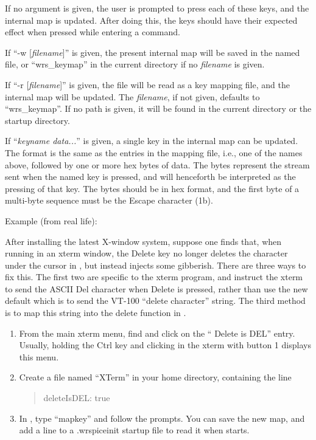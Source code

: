If no argument is given, the user is prompted to press each of these
keys, and the internal map is updated.  After doing this, the keys
should have their expected effect when pressed while entering a
{\WRspice} command.

If ``{\vt -w} [{\it filename\/}]'' is given, the present internal
map will be saved in the named file, or ``{\vt wrs\_keymap}'' in the
current directory if no {\it filename} is given.

If ``{\vt -r} [{\it filename\/}]'' is given, the file will be read
as a key mapping file, and the internal map will be updated.  The
{\it filename}, if not given, defaults to ``{\vt wrs\_keymap}''.  If
no path is given, it will be found in the current directory or the
startup directory.

If ``{\it keyname data...}'' is given, a single key in the internal
map can be updated.  The format is the same as the entries in the
mapping file, i.e., one of the names above, followed by one or more
hex bytes of data.  The bytes represent the stream sent when the named
key is pressed, and will henceforth be interpreted as the pressing of
that key.  The bytes should be in hex format, and the first byte of a
multi-byte sequence must be the {\kb Escape} character (1b).

Example (from real life):

After installing the latest X-window system, suppose one finds that,
when running {\WRspice} in an {\vt xterm} window, the {\kb Delete} key
no longer deletes the character under the cursor in {\WRspice}, but
instead injects some gibberish.  There are three ways to fix this. 
The first two are specific to the {\vt xterm} program, and instruct
the {\vt xterm} to send the ASCII Del character when {\kb Delete} is
pressed, rather than use the new default which is to send the VT-100
``delete character'' string.  The third method is to map this string
into the delete function in {\WRspice}.

\begin{enumerate}
\item{From the main {\vt xterm} menu, find and click on the ``{\cb
Delete is DEL}'' entry.  Usually, holding the {\kb Ctrl} key and
clicking in the {\vt xterm} with button 1 displays this menu.}

\item{Create a file named ``{\vt XTerm}'' in your home directory,
containing the line
\begin{quote}
{\vt *deleteIsDEL: true}
\end{quote}}

\item{In {\WRspice}, type ``{\vt mapkey}'' and follow the prompts. 
You can save the new map, and add a line to a {\vt .wrspiceinit}
startup file to read it when {\WRspice} starts.}
\end{enumerate}


